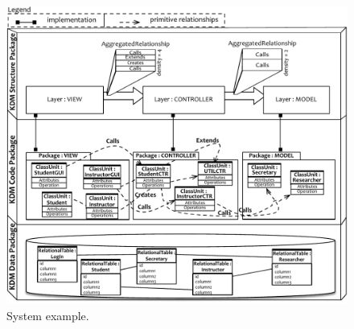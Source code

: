 \begin{figure}
	\centering
	\includegraphics[scale=0.8]{figuras/NovoSystem3}
	\caption{System example.}
	\label{fig:system}
\end{figure}




